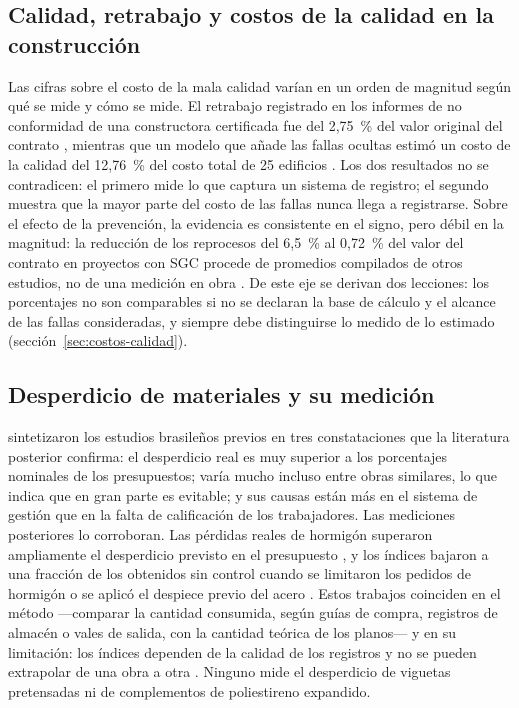 \subsection{Calidad, retrabajo y costos de la calidad en la construcción}

Las cifras sobre el costo de la mala calidad varían en un orden de magnitud según qué se mide y cómo se mide. El retrabajo registrado en los informes de no conformidad de una constructora certificada fue del 2,75~\% del valor original del contrato \parencite[p.~8]{forcada2017}, mientras que un modelo que añade las fallas ocultas estimó un costo de la calidad del 12,76~\% del costo total de 25 edificios \parencite[pp.~5420--5423]{khadim2023}. Los dos resultados no se contradicen: el primero mide lo que captura un sistema de registro; el segundo muestra que la mayor parte del costo de las fallas nunca llega a registrarse. Sobre el efecto de la prevención, la evidencia es consistente en el signo, pero débil en la magnitud: la reducción de los reprocesos del 6,5~\% al 0,72~\% del valor del contrato en proyectos con SGC procede de promedios compilados de otros estudios, no de una medición en obra \parencite[pp.~12, 20]{alvarez2014}. De este eje se derivan dos lecciones: los porcentajes no son comparables si no se declaran la base de cálculo y el alcance de las fallas consideradas, y siempre debe distinguirse lo medido de lo estimado (sección~\ref{sec:costos-calidad}).

\subsection{Desperdicio de materiales y su medición}

\textcite[pp.~326--327]{formoso1999} sintetizaron los estudios brasileños previos en tres constataciones que la literatura posterior confirma: el desperdicio real es muy superior a los porcentajes nominales de los presupuestos; varía mucho incluso entre obras similares, lo que indica que en gran parte es evitable; y sus causas están más en el sistema de gestión que en la falta de calificación de los trabajadores. Las mediciones posteriores lo corroboran. Las pérdidas reales de hormigón superaron ampliamente el desperdicio previsto en el presupuesto \parencite[pp.~33, 69]{rojas2018}, y los índices bajaron a una fracción de los obtenidos sin control cuando se limitaron los pedidos de hormigón \parencite[pp.~53, 73]{galarza2011} o se aplicó el despiece previo del acero \parencite[pp.~147, 169]{chino2024}. Estos trabajos coinciden en el método ---comparar la cantidad consumida, según guías de compra, registros de almacén o vales de salida, con la cantidad teórica de los planos--- y en su limitación: los índices dependen de la calidad de los registros y no se pueden extrapolar de una obra a otra \parencite[p.~39]{galarza2011}. Ninguno mide el desperdicio de viguetas pretensadas ni de complementos de poliestireno expandido.

